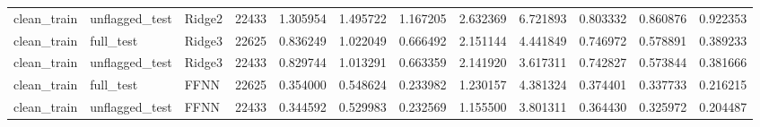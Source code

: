 \begin{tabular}{lllrrrrrrrrr}
clean_train & unflagged_test & Ridge2 & 22433 & 1.305954 & 1.495722 & 1.167205 & 2.632369 & 6.721893 & 0.803332 & 0.860876 & 0.922353 \\
clean_train & full_test & Ridge3 & 22625 & 0.836249 & 1.022049 & 0.666492 & 2.151144 & 4.441849 & 0.746972 & 0.578891 & 0.389233 \\
clean_train & unflagged_test & Ridge3 & 22433 & 0.829744 & 1.013291 & 0.663359 & 2.141920 & 3.617311 & 0.742827 & 0.573844 & 0.381666 \\
clean_train & full_test & FFNN & 22625 & 0.354000 & 0.548624 & 0.233982 & 1.230157 & 4.381324 & 0.374401 & 0.337733 & 0.216215 \\
clean_train & unflagged_test & FFNN & 22433 & 0.344592 & 0.529983 & 0.232569 & 1.155500 & 3.801311 & 0.364430 & 0.325972 & 0.204487 \\
\bottomrule
\end{tabular}
